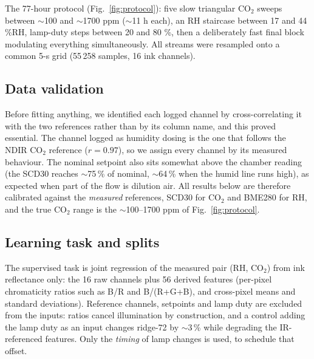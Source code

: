 \documentclass[twocolumn]{revtex4}
\begin{document}
The 77-hour protocol (Fig.~\ref{fig:protocol}): five slow triangular
CO$_2$ sweeps between $\sim$100 and $\sim$1700 ppm ($\sim$11 h each), an
RH staircase between 17 and 44 \%RH, lamp-duty steps between 20 and
80 \%, then a deliberately fast final block modulating everything
simultaneously. All streams were resampled onto a common 5-s grid
(55\,258 samples, 16 ink channels).

\subsection{Data validation}
\label{sec:validation}

Before fitting anything, we identified each logged channel by
cross-correlating it with the two references rather than by its column
name, and this proved essential. The channel logged as humidity dosing
is the one that follows the NDIR CO$_2$ reference ($r=0.97$), so we
assign every channel by its measured behaviour. The nominal setpoint
also sits somewhat above the chamber reading (the SCD30 reaches
$\sim$75\,\% of nominal, $\sim$64\,\% when the humid line runs high), as
expected when part of the flow is dilution air. All results below are
therefore calibrated against the \emph{measured} references, SCD30 for
CO$_2$ and BME280 for RH, and the true CO$_2$ range is the $\sim$100--1700 ppm
of Fig.~\ref{fig:protocol}.

\subsection{Learning task and splits}
\label{sec:task}

The supervised task is joint regression of the measured pair (RH, CO$_2$)
from ink reflectance only: the 16 raw channels plus 56 derived features
(per-pixel chromaticity ratios such as B/R and B/(R+G+B), and cross-pixel
means and standard deviations). Reference channels, setpoints and lamp duty
are excluded from the inputs: ratios cancel illumination by construction,
and a control adding the lamp duty as an input changes ridge-72 by
$\sim$3\,\% while degrading the IR-referenced features. Only the \emph{timing} of lamp changes is used, to
schedule that offset.
\end{document}
